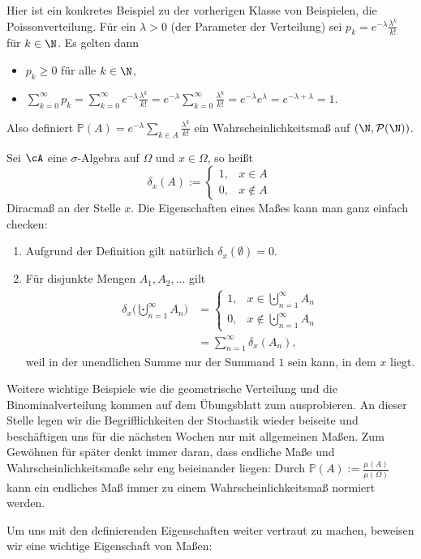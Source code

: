 \begin{beispiel}[Poissonverteilung]\label{Poi1}
	Hier ist ein konkretes Beispiel zu der vorherigen Klasse von Beispielen, die Poissonverteilung. F\"ur ein $\lambda >0$ (der Parameter der Verteilung) sei
	$p_k = e^{-\lambda} \frac{\lambda^k}{k!}$ f\"ur $k\in\N$. Es gelten dann
	\begin{itemize}
		\item $p_k \geq 0$ f\"ur alle $k\in\N$,
		\item $\sum\limits_{k=0}^{\infty} p_k = \sum\limits_{k=0}^{\infty} e^{-\lambda} \frac{\lambda^k}{k!} = e^{-\lambda} \sum\limits_{k=0}^{\infty} \frac{\lambda^k}{k!} = e^{-\lambda} e^{\lambda} = e^{-\lambda + \lambda} = 1$.
	\end{itemize}
	Also definiert $\mathbb P(A)=e^{-\lambda} \sum_{k\in A} \frac{\lambda^k}{k!}$ ein Wahrscheinlichkeitsma\ss{} auf $(\N, \mathcal P(\N))$.
\end{beispiel}
\begin{beispiel}[Diracmaß]
	Sei $\cA$ eine $\sigma$-Algebra auf $\Omega$ und $x \in \Omega$, so heißt $$\delta_x(A):=\begin{cases}
	1,&x \in A\\
	0,&x \notin A
	\end{cases} \:$$ Diracmaß an der Stelle $x$. Die Eigenschaften eines Ma\ss es kann man ganz einfach checken:
	\begin{enumerate}[label=(\roman*)]
		\item Aufgrund der Definition gilt nat\"urlich $\delta_x(\emptyset) = 0$.
		\item F\"ur disjunkte Mengen $A_1 ,A_2, ...$ gilt 
		\begin{align*}
		\delta_x\Big(\bigcupdot\limits_{n=1}^{\infty} A_n\Big) &= \begin{cases}
		1,&x \in \bigcupdot\limits_{n=1}^{\infty} A_n\\
		0,&x \notin \bigcupdot\limits_{n=1}^{\infty} A_n
		\end{cases}\\& = \sum\limits_{n=1}^{\infty} \delta_x(A_n),
		\end{align*}
		 weil in der unendlichen Summe nur der Summand $1$ sein kann, in dem $x$ liegt.
	\end{enumerate}
\end{beispiel}
Weitere wichtige Beispiele wie die geometrische Verteilung und die Binominalverteilung kommen auf dem \"Ubungsblatt zum ausprobieren. An dieser Stelle legen wir die Begrifflichkeiten der Stochastik wieder beiseite und besch\"aftigen uns f\"ur die n\"achsten Wochen nur mit allgemeinen Ma\ss en. Zum Gew\"ohnen f\"ur sp\"ater denkt immer daran, dass endliche Ma\ss e und Wahrscheinlichkeitsma\ss e sehr eng beieinander liegen: Durch $\mathbb P(A):=\frac{\mu(A)}{\mu(\Omega)}$ kann ein endliches Ma\ss{} immer zu einem Wahrscheinlichkeitsma\ss{} \glqq normiert\grqq{} werden.\smallskip

Um uns mit den definierenden Eigenschaften weiter vertraut zu machen, beweisen wir eine wichtige Eigenschaft von Ma\ss en:





